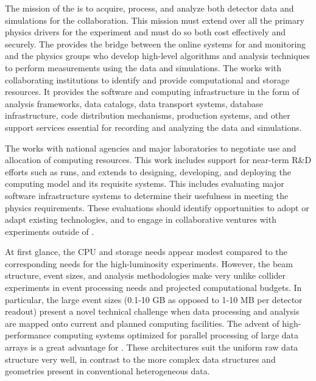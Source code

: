 The mission of the  %
 is to acquire, process, and analyze both detector data and  simulations for the %
collaboration.  This mission must extend over all the primary physics drivers for the experiment and must do so both cost effectively and securely. The  provides the bridge between the online systems for  and monitoring and the physics groups who develop high-level algorithms and analysis techniques to perform measurements using the   data and simulations. The  works with collaborating institutions to identify and provide computational and storage resources.  %
It provides the software and computing infrastructure in the form of analysis frameworks, data catalogs, data transport systems, database infrastructure, code distribution mechanisms, production systems, and other support services essential for recording and analyzing the data and simulations. 

The  works with national agencies and major laboratories to negotiate use and allocation of computing resources.  This work includes support for near-term R\&D efforts %
such as  runs, and extends to designing, developing, and deploying the  computing model and its requisite systems. 
This includes evaluating major software infrastructure systems to determine their usefulness %
in meeting the  physics requirements.  These evaluations should identify opportunities to adopt or adapt existing technologies, and to engage in collaborative ventures with  experiments outside of . 


At first glance,  the  CPU and storage needs %
appear modest %
compared to the corresponding needs for the high-luminosity  experiments.  
However, the  beam structure, event sizes, and analysis methodologies make  very unlike collider experiments %
in event processing needs and projected computational budgets. 
In particular, the large  event sizes (0.1-10 GB as opposed to 1-10 MB per detector readout) present a novel technical challenge when data processing and analysis are mapped onto  current and planned computing facilities. 
The advent of high-performance computing systems optimized for parallel processing of large data arrays is a great advantage for . These architectures suit the uniform  raw data structure very well, in contrast to the more complex data structures and geometries present in conventional %
heterogeneous  data. 



